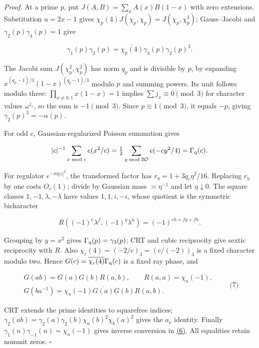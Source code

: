 \emph{Proof.} At a prime \(p\), put \(J(A,B)=\sum_xA(x)B(1-x)\) with zero extensions. Substitution \(u=2x-1\) gives \(\chi_p(4)J(\chi_p,\chi_p)=J(\chi_p,\chi_p^3)\); Gauss--Jacobi and \(\gamma_2(p)\gamma_4(p)=1\) give

\[
\gamma_1(p)\gamma_2(p)
=\overline{\chi_p(4)}\gamma_3(p)\gamma_2(p)^3.
\]

The Jacobi sum \(J(\chi_p^2,\chi_p^2)\) has norm \(q_p\) and is divisible by \(p\), by expanding \(x^{(q_p-1)/3}(1-x)^{(q_p-1)/3}\) modulo \(p\) and summing powers. Its unit follows modulo three: \(\prod_{x\ne0,1}x(1-x)=1\) implies \(\sum j_x\equiv0\pmod3\) for character values \(\omega^{j_x}\), so the sum is \(-1\pmod3\). Since \(p\equiv1\pmod3\), it equals \(-p\), giving \(\gamma_2(p)^3=-\alpha(p)\).

For odd \(c\), Gaussian-regularized Poisson summation gives

\[
|c|^{-1}\sum_{x\bmod c}e(x^2/c)
=\tfrac12\sum_{y\bmod2\mathcal O}e(-cy^2/4)=\Gamma_{\rm q}(c).
\]

For regulator \(e^{-\pi\eta|z|^2}\), the transformed factor has \(r_\eta=1+3q_c\eta^2/16\). Replacing \(r_\eta\) by one costs \(O_c(1)\); divide by Gaussian mass \(\asymp\eta^{-1}\) and let \(\eta\downarrow0\). The square classes \(1,-1,\lambda,-\lambda\) have values \(1,1,i,-i\), whose quotient is the symmetric bicharacter

\[
R((-1)^e\lambda^f,(-1)^g\lambda^h)=(-1)^{eh+fg+fh}.
\]

Grouping by \(y=x^2\) gives \(\Gamma_{\rm q}(p)=\gamma_3(p)\); CRT and cubic reciprocity give sextic reciprocity with \(R\). Also \(\chi_c(4)=(-2/c)_3=(c/(-2))_3\) is a fixed character modulo two. Hence \(G(c)=\overline{\chi_c(4)}\Gamma_{\rm q}(c)\) is a fixed ray phase, and

\hypertarget{cf:eq:A.2}{}

\label{cf:eq:A.2}

\[
\begin{gathered}
G(ab)=G(a)G(b)R(a,b),\qquad R(a,a)=\chi_a(-1),\\
G(ba^{-1})=\chi_a(-1)\overline{G(a)}G(b)R(a,b).
\end{gathered}
\qquad\text{(7)}
\]

CRT extends the prime identities to squarefree indices; \(\gamma_2(ab)=\gamma_2(a)\gamma_2(b)\chi_a(b)^2\chi_b(a)^2\) gives the \(a_\nu\) identity. Finally \(\gamma_1(n)\gamma_{-1}(n)=\chi_n(-1)\) gives inverse conversion in \protect\hyperlink{cf:eq:A.1}{(6)}. All equalities retain nonunit zeros. \(\square\)


